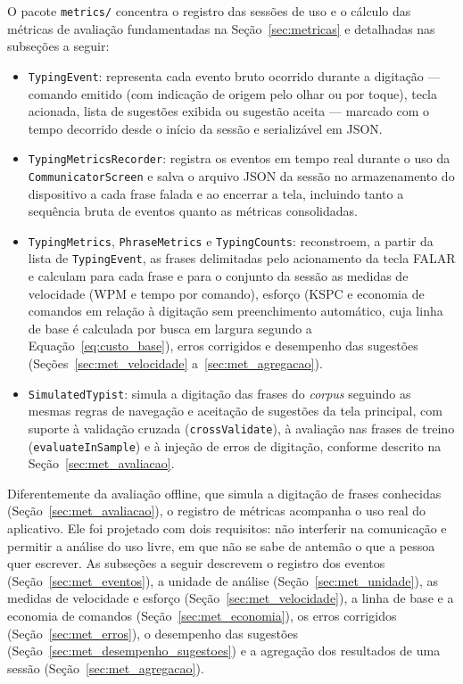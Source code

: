O pacote \texttt{metrics/} concentra o registro das sessões de uso e o cálculo das métricas de avaliação fundamentadas na Seção~\ref{sec:metricas} e detalhadas nas subseções a seguir:

\begin{itemize}
    \item \texttt{TypingEvent}: representa cada evento bruto ocorrido durante a digitação --- comando emitido (com indicação de origem pelo olhar ou por toque), tecla acionada, lista de sugestões exibida ou sugestão aceita --- marcado com o tempo decorrido desde o início da sessão e serializável em JSON.
    \item \texttt{TypingMetricsRecorder}: registra os eventos em tempo real durante o uso da \texttt{CommunicatorScreen} e salva o arquivo JSON da sessão no armazenamento do dispositivo a cada frase falada e ao encerrar a tela, incluindo tanto a sequência bruta de eventos quanto as métricas consolidadas.
    \item \texttt{TypingMetrics}, \texttt{PhraseMetrics} e \texttt{TypingCounts}: reconstroem, a partir da lista de \texttt{TypingEvent}, as frases delimitadas pelo acionamento da tecla FALAR e calculam para cada frase e para o conjunto da sessão as medidas de velocidade (WPM e tempo por comando), esforço (KSPC e economia de comandos em relação à digitação sem preenchimento automático, cuja linha de base é calculada por busca em largura segundo a Equação~\ref{eq:custo_base}), erros corrigidos e desempenho das sugestões (Seções~\ref{sec:met_velocidade} a~\ref{sec:met_agregacao}).
    \item \texttt{SimulatedTypist}: simula a digitação das frases do \textit{corpus} seguindo as mesmas regras de navegação e aceitação de sugestões da tela principal, com suporte à validação cruzada (\texttt{crossValidate}), à avaliação nas frases de treino (\texttt{evaluateInSample}) e à injeção de erros de digitação, conforme descrito na Seção~\ref{sec:met_avaliacao}.
\end{itemize}

Diferentemente da avaliação offline, que simula a digitação de frases conhecidas (Seção~\ref{sec:met_avaliacao}), o registro de métricas acompanha o uso real do aplicativo. Ele foi projetado com dois requisitos: não interferir na comunicação e permitir a análise do uso livre, em que não se sabe de antemão o que a pessoa quer escrever. As subseções a seguir descrevem o registro dos eventos (Seção~\ref{sec:met_eventos}), a unidade de análise (Seção~\ref{sec:met_unidade}), as medidas de velocidade e esforço (Seção~\ref{sec:met_velocidade}), a linha de base e a economia de comandos (Seção~\ref{sec:met_economia}), os erros corrigidos (Seção~\ref{sec:met_erros}), o desempenho das sugestões (Seção~\ref{sec:met_desempenho_sugestoes}) e a agregação dos resultados de uma sessão (Seção~\ref{sec:met_agregacao}).

